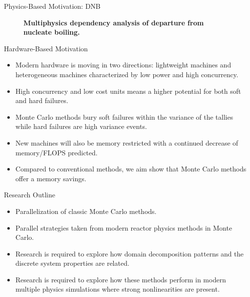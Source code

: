 \documentclass{beamer}
\begin{document}
\begin{frame}{Physics-Based Motivation: DNB}
  \begin{figure}[htpb!]
    \begin{center}
      \scalebox{1}{  }
    \end{center}
    \caption{\textbf{Multiphysics dependency analysis of departure
        from nucleate boiling.} }
    \label{fig:dnb_example}
  \end{figure}
\end{frame}

\begin{frame}{Hardware-Based Motivation}
  \begin{itemize}
    \item Modern hardware is moving in two directions: lightweight
      machines and heterogeneous machines characterized by low power
      and high concurrency.
    \item High concurrency and low cost units means a higher potential
      for both soft and hard failures.
    \item Monte Carlo methods bury soft failures within the variance
      of the tallies while hard failures are high variance events.
    \item New machines will also be memory restricted with a continued
      decrease of memory/FLOPS predicted.
    \item Compared to conventional methods, we aim show that Monte
      Carlo methods offer a memory savings.
  \end{itemize}
\end{frame}

\begin{frame}{Research Outline}
  \begin{itemize}
    \item Parallelization of classic Monte Carlo methods.
    \item Parallel strategies taken from modern reactor physics
      methods in Monte Carlo.
    \item Research is required to explore how domain decomposition
      patterns and the discrete system properties are related.
    \item Research is required to explore how these methods perform
      in modern multiple physics simulations where strong
      nonlinearities are present.
  \end{itemize}
\end{frame}
\end{document}
